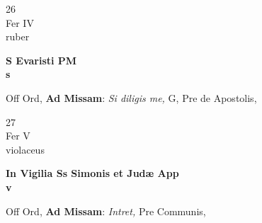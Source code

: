 \documentclass[10pt, openany]{book}
\begin{document}
        \begin{center}
            \begin{minipage}{3.5in}
                \vspace{2em}
                \begin{minipage}{0.5in}
                    {\Huge 26} \\
                    {\normalsize Fer IV} \\
                    {\normalsize ruber}
                \end{minipage}
                \begin{minipage}{3.0in}
                    \textbf{ \large S Evaristi PM \\
                    \textnormal{\normalsize s}} \\ 
                \end{minipage}
                \begin{justify}Off Ord, \textbf{Ad Missam}: \textit{Si diligis me,} G, Pre de Apostolis,   
                \end{justify}
            \end{minipage}
        \end{center}
    
        \begin{center}
            \begin{minipage}{3.5in}
                \vspace{2em}
                \begin{minipage}{0.5in}
                    {\Huge 27} \\
                    {\normalsize Fer V} \\
                    {\normalsize violaceus}
                \end{minipage}
                \begin{minipage}{3.0in}
                    \textbf{ \large In Vigilia Ss Simonis et Judæ App \\
                    \textnormal{\normalsize v}} \\ 
                \end{minipage}
                \begin{justify}Off Ord, \textbf{Ad Missam}: \textit{Intret,} Pre Communis,   
                \end{justify}
            \end{minipage}
        \end{center}
    
\end{document}
